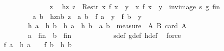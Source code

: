 \begin{isabellebody}
\ \ \ \ \ \ \isamarkupfalse%
\isanewline
\ \ \ \ \ \ \ \ \isamarkupfalse%
\ z\ \isamarkupfalse%
\ hz{\isacharcolon}{\kern0pt}\ {\isachardoublequoteopen}z\ {\isasymin}\ Restr\ {\isacharparenleft}{\kern0pt}{\isacharbraceleft}{\kern0pt}x{\isachardot}{\kern0pt}\ f\ x\ {\isacharequal}{\kern0pt}\ y{\isacharbraceright}{\kern0pt}\ {\isasymtimes}\ {\isacharbraceleft}{\kern0pt}x{\isachardot}{\kern0pt}\ f\ x\ {\isacharequal}{\kern0pt}\ y{\isacharbraceright}{\kern0pt}\ {\isasyminter}\ {\isacharparenleft}{\kern0pt}inv{\isacharunderscore}{\kern0pt}image\ s\ g{\isacharparenright}{\kern0pt}{\isacharparenright}{\kern0pt}\ {\isacharquery}{\kern0pt}fin{\isachardoublequoteclose}\isanewline
\ \ \ \ \ \ \ \ \isamarkupfalse%
\ \isamarkupfalse%
\ a\ b\ \ hzab{\isacharcolon}{\kern0pt}\ {\isachardoublequoteopen}z\ {\isacharequal}{\kern0pt}\ {\isacharparenleft}{\kern0pt}a{\isacharcomma}{\kern0pt}\ b{\isacharparenright}{\kern0pt}{\isachardoublequoteclose}\ \ {\isachardoublequoteopen}f\ a\ {\isacharequal}{\kern0pt}\ y{\isachardoublequoteclose}\ \ {\isachardoublequoteopen}f\ b\ {\isacharequal}{\kern0pt}\ y{\isachardoublequoteclose}\ \ \isanewline
\ \ \ \ \ \ \ \ \ \ {\isachardoublequoteopen}h\ a\ {\isachargreater}{\kern0pt}\ h\ b\ {\isasymor}\ h\ a\ {\isacharequal}{\kern0pt}\ h\ b\ {\isasymand}\ {\isacharparenleft}{\kern0pt}a{\isacharcomma}{\kern0pt}\ b{\isacharparenright}{\kern0pt}\ {\isasymin}\ measure\ {\isacharparenleft}{\kern0pt}{\isasymlambda}\ {\isacharparenleft}{\kern0pt}A{\isacharcomma}{\kern0pt}\ B{\isacharparenright}{\kern0pt}{\isachardot}{\kern0pt}\ card\ A{\isacharparenright}{\kern0pt}{\isachardoublequoteclose}\ \ \isanewline
\ \ \ \ \ \ \ \ \ \ {\isachardoublequoteopen}a\ {\isasymin}\ {\isacharquery}{\kern0pt}fin{\isachardoublequoteclose}\ \ {\isachardoublequoteopen}b\ {\isasymin}\ {\isacharquery}{\kern0pt}fin{\isachardoublequoteclose}\isanewline
\ \ \ \ \ \ \ \ \ \ \isamarkupfalse%
\ s{\isacharunderscore}{\kern0pt}def\ g{\isacharunderscore}{\kern0pt}def\ h{\isacharunderscore}{\kern0pt}def\ \isamarkupfalse%
\ force\isanewline
\ \ \ \ \ \ \ \ \isamarkupfalse%
\ \isamarkupfalse%
\ {\isachardoublequoteopen}{}\ {\isacharasterisk}{\kern0pt}\ f\ a\ {\isacharminus}{\kern0pt}\ h\ a\ {\isacharless}{\kern0pt}\ {}\ {\isacharasterisk}{\kern0pt}\ f\ b\ {\isacharminus}{\kern0pt}\ h\ b\ {\isasymor}\ \isanewline

\end{isabellebody}
